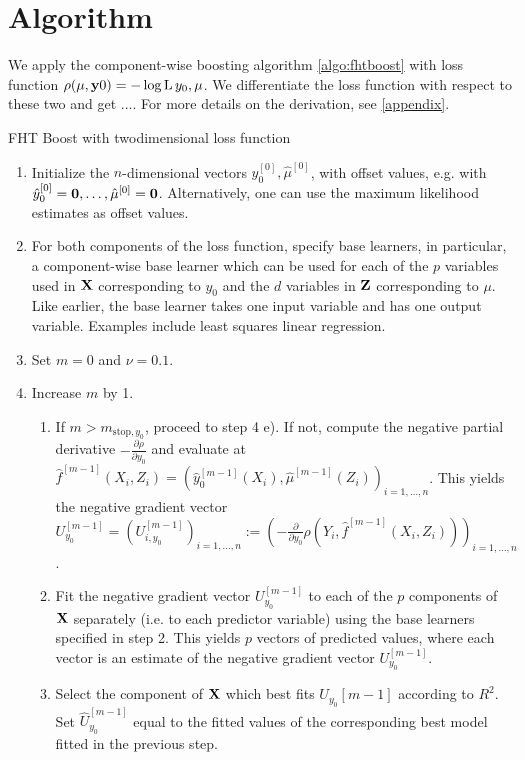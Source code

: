 \section{Algorithm}
We apply the component-wise boosting algorithm \ref{algo:fhtboost} with loss function $\rho(\mu,\mathbf{y}0)=-\log\operatorname{L}{y_0,\mu}$. We differentiate the loss function with respect to these two and get .... For more details on the derivation, see \ref{appendix}. 

\begin{algorithm}
\caption{FHT Boost with twodimensional loss function}
\label{algo:fhtboost}
\begin{enumerate}
    \item Initialize the $n$-dimensional vectors $\hat{y}_0^{[0]},\hat{\mu}^{[0]}$, with offset values, e.g. with $\hat{y}_0^{[0]}=\mathbf{0},\ldots,\hat{\mu}^{[0]}=\mathbf{0}$. Alternatively, one can use the maximum likelihood estimates as offset values.
    \item For both components of the loss function, specify base learners, in particular, a component-wise base learner which can be used for each of the $p$ variables used in $\mathbf{X}$ corresponding to $y_0$ and the $d$ variables in $\mathbf{Z}$ corresponding to $\mu$. Like earlier, the base learner takes one input variable and has one output variable. Examples include least squares linear regression.
    \item Set $m=0$ and $\nu=0.1$.
    \item Increase $m$ by 1.
    \begin{enumerate}
        \item If $m>m_{\text{stop},y_0}$, proceed to step 4 e). If not, compute the negative partial derivative $-\frac{\partial\rho}{\partial y_0}$ and evaluate at $\hat{f}^{[m-1]}(X_i,Z_i)=\left(\hat{y}_0^{[m-1]}(X_i),\hat{\mu}^{[m-1]}(Z_i)\right)_{i=1,\ldots,n}$. This yields the negative gradient vector $U_{y_0}^{[m-1]}=\left(U_{i,y_0}^{[m-1]}\right)_{i=1,\ldots,n}:=\left(-\frac{\partial}{\partial y_0}\rho\left(Y_i,\hat{f}^{[m-1]}(X_i,Z_i)\right)\right)_{i=1,\ldots,n}$.
        \item Fit the negative gradient vector $U_{y_0}^{[m-1]}$ to each of the $p$ components of $\mathbf{X}$ separately (i.e. to each predictor variable) using the base learners specified in step 2. This yields $p$ vectors of predicted values, where each vector is an estimate of the negative gradient vector $U_{y_0}^{[m-1]}$.
        \item Select the component of $\mathbf{X}$ which best fits $U_{y_0}{[m-1]}$ according to $R^2$. Set $\hat{U}_{y_0}^{[m-1]}$ equal to the fitted values of the corresponding best model fitted in the previous step.

\end{enumerate}
\end{enumerate}
\end{algorithm}
